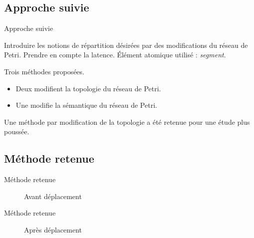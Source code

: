 \subsection{Approche suivie}
\begin{frame}{Approche suivie}
	\begin{itemize}
		\itemar Introduire les notions de répartition désirées par des modifications du réseau de Petri.
		\itemar Prendre en compte la latence.
		\itemar Élément atomique utilisé : \textit{segment}.
	\end{itemize}
	\vspace{1em}
	Trois méthodes proposées.
	\begin{itemize}
		\item Deux modifient la topologie du réseau de Petri.
		\item Une modifie la sémantique du réseau de Petri.
	\end{itemize}
	
	Une méthode par modification de la topologie a été retenue pour une étude plus poussée.
\end{frame}

\subsection{Méthode retenue}
\begin{frame}{Méthode retenue}
	\begin{figure}[h!]
		\centering
		
		\caption{Avant déplacement}
		\label{fig:deplacementMethode2}
	\end{figure}
\end{frame}

\begin{frame}{Méthode retenue}
	\begin{figure}[h!]
		\centering
		\resizebox{11cm}{!}{}
		\caption{Après déplacement}
		\label{fig:deplacementMethode2-2}
	\end{figure}
\end{frame}

